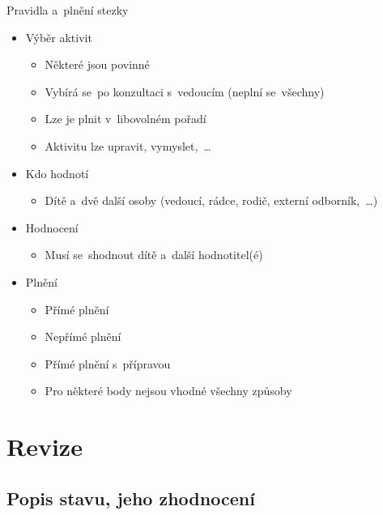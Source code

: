 \documentclass[compress, ucs, xelatex, 11pt, xcolor=dvipsnames, print,
	hyperref={
		bookmarks=true,
		unicode=true,
		colorlinks=true,
		pdftitle={Skautska vychovna metoda},
		plainpages=false,
		pdfauthor={Vojtech Zeisek},
		pdfsubject={Skautska vychovna metoda a jeji vyvoj za posledni stoleti a desetileti},
		pdfcreator={XeLaTeX},
		pdfkeywords={Junak, Pedagogika, Skaut, Skauting, Vychovna metoda},
		linkcolor=Black,
		anchorcolor=Black,
		citecolor=OliveGreen,
		filecolor=OliveGreen,
		menucolor=Black,
		urlcolor=OliveGreen,
		pdftex},
	url={hyphens, lowtilde} %
	]{beamer}
\begin{document}
\begin{frame}{Pravidla a~plnění stezky}
	\begin{itemize}
		\item Výběr aktivit
		\begin{itemize}
			\item Některé jsou povinné
			\item Vybírá se~po konzultaci s~vedoucím (neplní se~všechny)
			\item Lze je plnit v~libovolném pořadí
			\item Aktivitu lze upravit, vymyslet,~\ldots
		\end{itemize}
		\item Kdo hodnotí
		\begin{itemize}
			\item Dítě a~dvě další osoby (vedoucí, rádce, rodič, externí odborník,~\ldots)
		\end{itemize}
		\item Hodnocení
		\begin{itemize}
			\item Musí se~shodnout dítě a~další hodnotitel(é)
		\end{itemize}
		\item Plnění
		\begin{itemize}
			\item Přímé plnění
			\item Nepřímé plnění
			\item Přímé plnění s~přípravou
			\item Pro některé body nejsou vhodné všechny způsoby
		\end{itemize}
	\end{itemize}
\end{frame}

\section{Revize}

\subsection{Popis stavu, jeho zhodnocení}
\end{document}
